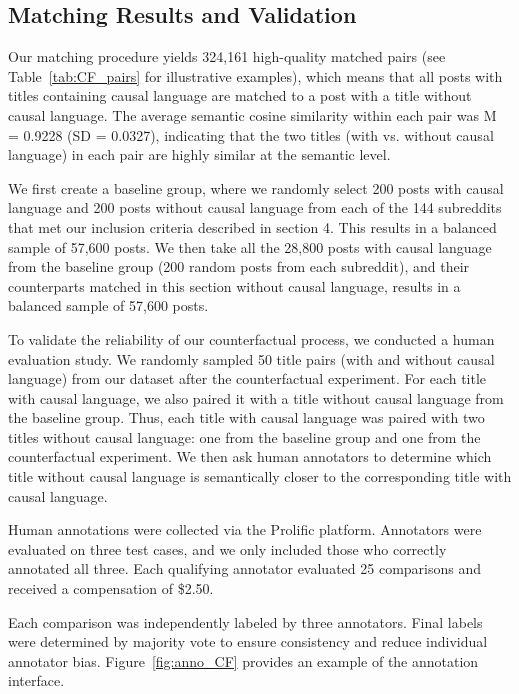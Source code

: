 \documentclass[acmsmall]{acmart}
\begin{document}
\subsection{Matching Results and Validation}

Our matching procedure yields 324,161 high-quality matched pairs (see Table~\ref{tab:CF_pairs} for illustrative examples), which means that all posts with titles containing causal language are matched to a post with a title without causal language. The average semantic cosine similarity within each pair was M = 0.9228 (SD = 0.0327), indicating that the two titles (with vs. without causal language) in each pair are highly similar at the semantic level.

We first create a baseline group, where we randomly select 200 posts with causal language and 200 posts without causal language from each of the 144 subreddits that met our inclusion criteria described in section 4. This results in a balanced sample of 57,600 posts. We then take all the 28,800 posts with causal language from the baseline group (200 random posts from each subreddit), and their counterparts matched in this section without causal language, results in a balanced sample of 57,600 posts.


To validate the reliability of our counterfactual process, we conducted a human evaluation study. We randomly sampled 50 title pairs (with and without causal language) from our dataset after the counterfactual experiment. For each title with causal language, we also paired it with a title without causal language from the baseline group. Thus, each title with causal language was paired with two titles without causal language: one from the baseline group and one from the counterfactual experiment. We then ask human annotators to determine which title without causal language is semantically closer to the corresponding title with causal language.

Human annotations were collected via the Prolific platform. Annotators were evaluated on three test cases, and we only included those who correctly annotated all three. Each qualifying annotator evaluated 25 comparisons and received a compensation of \$2.50.

Each comparison was independently labeled by three annotators. Final labels were determined by majority vote to ensure consistency and reduce individual annotator bias. Figure~\ref{fig:anno_CF} provides an example of the annotation interface.
\end{document}
